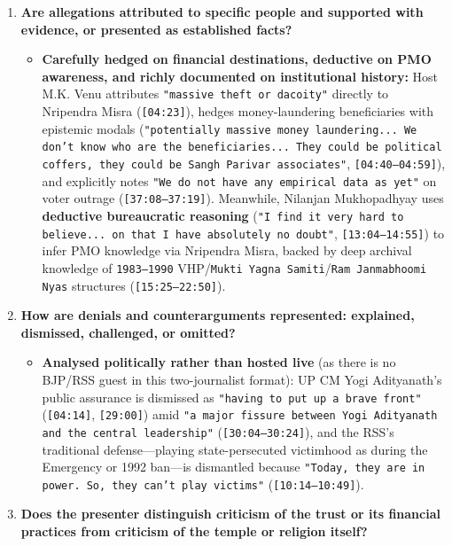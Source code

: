 \documentclass[10pt,a4paper]{article}
\begin{document}
\begin{enumerate}[leftmargin=1.6em, itemsep=4pt, topsep=4pt]
  \item \textbf{Are allegations attributed to specific people and supported with evidence, or presented as established facts?}
  \begin{itemize}[leftmargin=1.4em, itemsep=2pt, topsep=2pt]
    \item \textbf{Carefully hedged on financial destinations, deductive on PMO awareness, and richly documented on institutional history:} Host M.K. Venu attributes \texttt{"massive theft or dacoity"} directly to Nripendra Misra (\texttt{[04:23]}), hedges money-laundering beneficiaries with epistemic modals (\texttt{"potentially massive money laundering... We don't know who are the beneficiaries... They could be political coffers, they could be Sangh Parivar associates"}, \texttt{[04:40--04:59]}), and explicitly notes \texttt{"We do not have any empirical data as yet"} on voter outrage (\texttt{[37:08--37:19]}). Meanwhile, Nilanjan Mukhopadhyay uses \textbf{deductive bureaucratic reasoning} (\texttt{"I find it very hard to believe... on that I have absolutely no doubt"}, \texttt{[13:04--14:55]}) to infer PMO knowledge via Nripendra Misra, backed by deep archival knowledge of \texttt{1983--1990} VHP/\texttt{Mukti Yagna Samiti}/\texttt{Ram Janmabhoomi Nyas} structures (\texttt{[15:25--22:50]}).
  \end{itemize}
  \item \textbf{How are denials and counterarguments represented: explained, dismissed, challenged, or omitted?}
  \begin{itemize}[leftmargin=1.4em, itemsep=2pt, topsep=2pt]
    \item \textbf{Analysed politically rather than hosted live} (as there is no BJP/RSS guest in this two-journalist format): UP CM Yogi Adityanath's public assurance is dismissed as \texttt{"having to put up a brave front"} (\texttt{[04:14]}, \texttt{[29:00]}) amid \texttt{"a major fissure between Yogi Adityanath and the central leadership"} (\texttt{[30:04--30:24]}), and the RSS's traditional defense---playing state-persecuted victimhood as during the Emergency or 1992 ban---is dismantled because \texttt{"Today, they are in power. So, they can't play victims"} (\texttt{[10:14--10:49]}).
  \end{itemize}
  \item \textbf{Does the presenter distinguish criticism of the trust or its financial practices from criticism of the temple or religion itself?}
  \begin{itemize}[leftmargin=1.4em, itemsep=2pt, topsep=2pt]

\end{itemize}
\end{enumerate}
\end{document}
